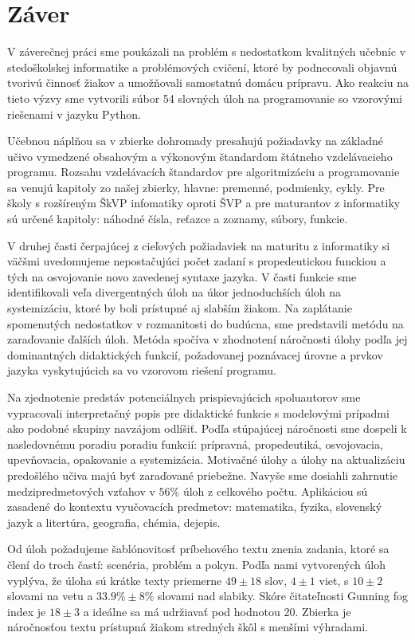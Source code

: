 \chapter{Záver}
V záverečnej práci sme poukázali na problém s nedostatkom kvalitných učebníc v stedoškolskej informatike a problémových cvičení, ktoré by podnecovali objavnú tvorivú činnosť žiakov a umožňovali samostatnú domácu prípravu. Ako reakciu na tieto výzvy sme vytvorili súbor 54 slovných úloh na programovanie so vzorovými riešenami v jazyku Python. 

Učebnou náplňou sa v zbierke dohromady presahujú požiadavky na základné učivo vymedzené obsahovým a výkonovým štandardom štátneho vzdelávacieho programu. Rozsahu vzdelávacích štandardov pre algoritmizáciu a programovanie sa venujú kapitoly zo našej zbierky, hlavne: premenné, podmienky, cykly. Pre školy s rozšíreným ŠkVP infomatiky oproti ŠVP a pre maturantov z informatiky sú určené kapitoly: náhodné čísla, reťazce a zoznamy, súbory, funkcie. 

V druhej časti čerpajúcej z cieľových požiadaviek na maturitu z informatiky si väčšmi uvedomujeme nepostačujúci počet zadaní s propedeutickou funckiou a tých na osvojovanie novo zavedenej syntaxe jazyka. V časti funkcie sme identifikovali veľa divergentných úloh na úkor jednoduchších úloh na systemizáciu, ktoré by boli prístupné aj slabším žiakom. Na zaplátanie spomenutých nedostatkov v rozmanitosti do budúcna, sme predstavili metódu na zaraďovanie ďalších úloh. Metóda spočíva v zhodnotení náročnosti úlohy podľa jej dominantných didaktických funkcií, požadovanej poznávacej úrovne a prvkov jazyka vyskytujúcich sa vo vzorovom riešení programu. 

Na zjednotenie predstáv potenciálnych prispievajúcich spoluautorov sme vypracovali interpretačný popis pre didaktické funkcie s modelovými prípadmi ako podobné skupiny navzájom odlíšiť. Podľa stúpajúcej náročnosti sme dospeli k nasledovnému poradiu poradiu funkcií: prípravná, propedeutiká, osvojovacia, upevňovacia, opakovanie a systemizácia. Motivačné úlohy a úlohy na aktualizáciu predošlého učiva majú byť zaraďované priebežne. Navyše sme dosiahli zahrnutie medzipredmetových vzťahov v $56 \%$ úloh z celkového počtu. Aplikáciou sú zasadené do kontextu vyučovacích predmetov: matematika, fyzika, slovenský jazyk a litertúra, geografia, chémia, dejepis. 

Od úloh požadujeme šablónovitosť príbehového textu znenia zadania, ktoré sa člení do troch častí: scenéria, problém a pokyn. Podľa nami vytvorených úloh vyplýva, že úloha sú krátke texty priemerne $49 \pm 18$ slov, $4 \pm 1$ viet, s $10 \pm 2$ slovami na vetu a $33.9\% \pm 8\%$ slovami nad slabiky. Skóre čitateľnosti Gunning fog index je $18 \pm 3$ a ideálne sa má udržiavať pod hodnotou 20. Zbierka je náročnosťou textu prístupná žiakom stredných škôl s menšími výhradami. 

